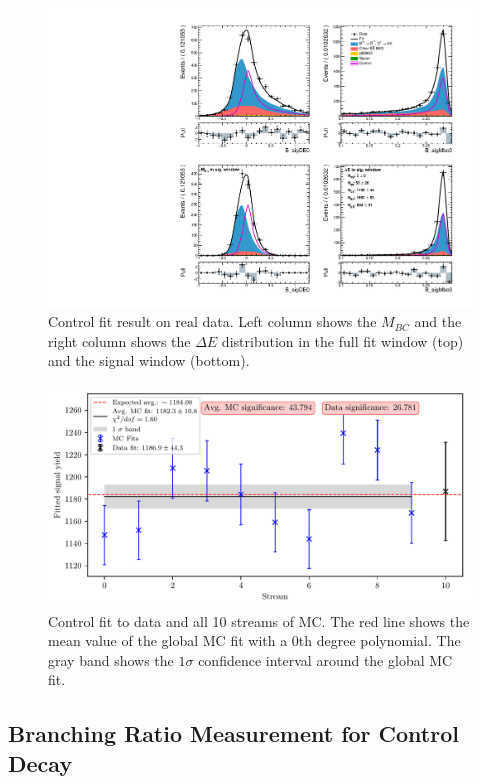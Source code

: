 \begin{figure}[H]
	\centering
	\captionsetup{width=0.8\linewidth}
	\includegraphics[width=\linewidth]{fig/cs_fit_data}
	\caption{Control fit result on real data. Left column shows the $M_{BC}$ and the right column shows the $\Delta E$ distribution in the full fit window (top) and the signal window (bottom).}
	\label{fig:cs_fit_data}
\end{figure}

\begin{figure}[H]
	\centering
	\captionsetup{width=0.8\linewidth}
	\includegraphics[width=\linewidth]{fig/cs_global}
	\caption{Control fit to data and all 10 streams of MC. The red line shows the mean value of the global MC fit with a 0th degree polynomial. The gray band shows the $1\sigma$ confidence interval around the global MC fit.}
	\label{fig:cs_global}
\end{figure}

\subsection{Branching Ratio Measurement for Control Decay}\label{sec:branching-ratio-measurement-for-control-decay}

